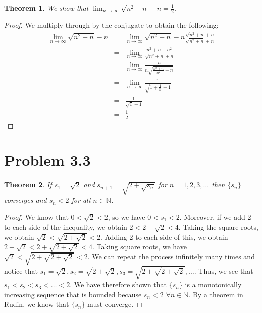 \documentclass[psamsfonts]{amsart}
\newtheorem{thm}{Theorem}[section]
\theoremstyle{definition}
\theoremstyle{remark}
\numberwithin{equation}{section}
\begin{document}
\begin{thm}
We show that $\lim_{ n \to \infty} \sqrt{n^2 + n} - n = \frac{1}{2}$.
\end{thm}

\begin{proof}
We multiply through by the conjugate to obtain the following:
\begin{eqnarray}
\lim_{ n \to \infty} \sqrt{n^2 + n} - n &=& \lim_{ n \to \infty} \sqrt{n^2 + n} - n \frac{\sqrt{n^2 + n} + n}{\sqrt{n^2 + n} + n} \\
&=& \lim_{n \to \infty} \frac{n^2 + n - n^2}{\sqrt{n^2 + n} + n} \nonumber \\
&=& \lim_{n \to \infty} \frac{n}{ n \sqrt{\frac{n^2 + n}{n^2} + n}} \nonumber \\
&=& \lim_{n \to \infty} \frac{1}{ \sqrt{1 + \frac{1}{n}} + 1} \nonumber \\
&=& \frac{1}{\sqrt{1} + 1} \nonumber \\
&=& \frac{1}{2} \nonumber
\end{eqnarray}
\end{proof}

\section{Problem 3.3}

\begin{thm}
If $s_1 = \sqrt{2}$ and $s_{n+1} = \sqrt{2 + \sqrt{s_n}}$ for $ n = 1,2,3, \ldots$ then $\{ s_n \}$ converges and $s_n < 2$ for all $n \in \mathbb{N}$. 
\end{thm}

\begin{proof}
We know that $0 < \sqrt{2} < 2$, so we have $0 < s_1 < 2$. Moreover, if we add 2 to each side of the inequality, we obtain $2 < 2 + \sqrt{2} < 4$. Taking the square roots, we obtain $\sqrt{2} < \sqrt{2 + \sqrt{2}} < 2$. Adding 2 to each side of this, we obtain $2 + \sqrt{2} < 2 + \sqrt{2 + \sqrt{2}} < 4$. Taking square roots, we have $\sqrt{2} < \sqrt{ 2 + \sqrt{2 + \sqrt{2}}} < 2$. We can repeat the process infinitely many times and notice that $s_1 = \sqrt{2}, s_2 = \sqrt{2 + \sqrt{2}}, s_3 = \sqrt{2 + \sqrt{2 + \sqrt{2}}}, \ldots$. Thus, we see that $s_1 < s_2 < s_3 < \ldots < 2$. We have therefore shown that $\{ s_n \}$ is a monotonically increasing sequence that is bounded because $s_n < 2$ $ \forall n \in \mathbb{N}$. By a theorem in Rudin, we know that $\{ s_n \}$ must converge.
\end{proof}
\end{document}
